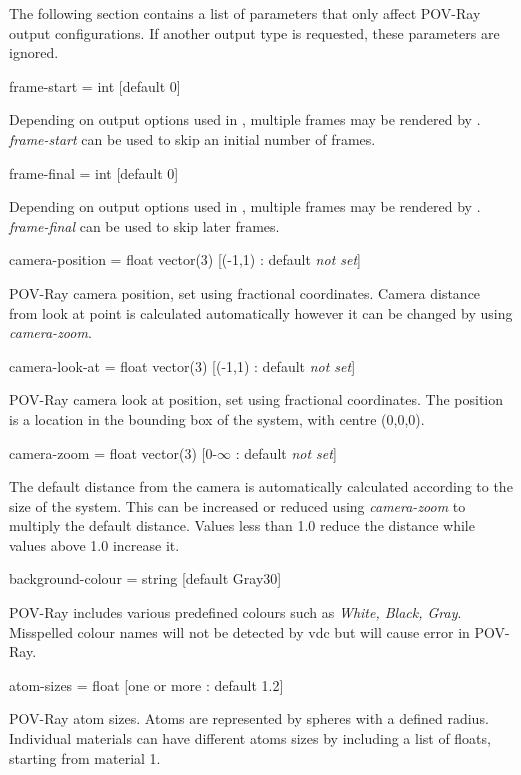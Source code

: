 The following section contains a list of parameters that only affect POV-Ray output configurations. If another output type is requested, these parameters are ignored.

{\zicf frame-start = int [default 0]} Depending on output options used in \vampire, multiple frames may be rendered by \vdc. \textit{frame-start} can be used to skip an initial number of frames.

{\zicf frame-final = int [default 0]} Depending on output options used in \vampire, multiple frames may be rendered by \vdc. \textit{frame-final} can be used to skip later frames.

{\zicf camera-position = float vector(3) [(-1,1) : default \textit{not set}]} POV-Ray camera position, set using fractional coordinates. Camera distance from look at point is calculated automatically however it can be changed by using \textit{camera-zoom}.

{\zicf camera-look-at = float vector(3) [(-1,1) : default \textit{not set}]} POV-Ray camera look at position, set using fractional coordinates. The position is a location in the bounding box of the system, with centre (0,0,0).

{\zicf camera-zoom = float vector(3) [0-$\infty$ : default \textit{not set}]} The default distance from the camera is automatically calculated according to the size of the system. This can be increased or reduced using \textit{camera-zoom} to multiply the default distance. Values less than 1.0 reduce the distance while values above 1.0 increase it.

{\zicf background-colour = string [default Gray30]} POV-Ray includes various predefined colours such as \textit{White, Black, Gray}. Misspelled colour names will not be detected by vdc but will cause error in POV-Ray.

{\zicf atom-sizes = float [one or more : default 1.2]} POV-Ray atom sizes. Atoms are represented by spheres with a defined radius. Individual materials can have different atoms sizes by including a list of floats, starting from material 1.

